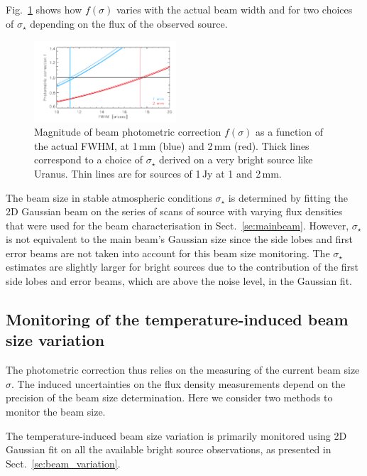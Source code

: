 \documentclass[traditionalabstract]{aa}
\begin{document}
{\begin{appendix}
Fig.~\ref{fig:f_sigma} shows how $f(\sigma)$ varies with the actual beam width
and for two choices of $\sigma_\star$ depending on the flux of the observed source.

\begin{figure}[ht!]
  \begin{center}
    \includegraphics[clip=true, trim={0.9cm, 0.1cm, 0.5cm, 0.5cm}, width=0.4725\textwidth]{Figures/photometric_correction_function_1Jy.pdf}
    \caption[Photometric correction]{Magnitude of beam photometric
      correction $f(\sigma)$ as a function of the actual FWHM, at 1\,mm (blue)
      and 2\,mm (red). Thick lines correspond to a choice of $\sigma_\star$
      derived on a very bright source like Uranus. Thin lines are for sources of
      1\,Jy at 1 and 2\,mm.}
\label{fig:f_sigma}
\end{center}
\end{figure}


The beam size in stable atmospheric conditions $\sigma_\star$ is
determined by fitting the 2D Gaussian beam on the series of scans of
source with varying flux densities that were used for the beam
characterisation in Sect.~\ref{se:mainbeam}. However, $\sigma_\star$
is not equivalent to the main beam's Gaussian size since the side lobes
and first error beams are not taken into account for this beam size
monitoring. The $\sigma_\star$ estimates are slightly
larger for bright sources due to the contribution of the first side
lobes and error beams, which are above the noise level, in the Gaussian fit.


\subsection{Monitoring of the temperature-induced beam size variation}
\label{ap:beam_monitoring}

The photometric correction thus relies on the measuring of the current beam size
$\sigma$. The induced uncertainties on the flux density measurements depend on
the precision of the beam size determination. Here we
consider two methods to monitor the beam size.

The temperature-induced beam size variation is primarily monitored
using 2D Gaussian fit on all the available bright source observations,
as presented in Sect.~\ref{se:beam_variation}. 


\end{appendix}}
\end{document}
